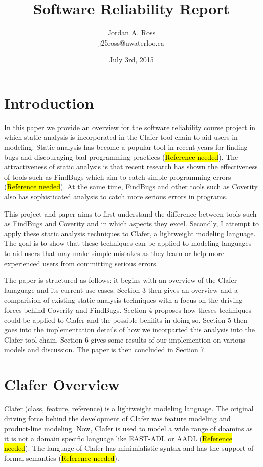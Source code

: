\documentclass[10pt,oneside]{IEEEtran}
\title{Software Reliability Report}
\author{Jordan A. Ross \\j25ross@uwaterloo.ca}
\date{July 3rd, 2015}
\begin{document}
\maketitle
\newpage

\section{Introduction}
In this paper we provide an overview for the software reliability course project in which static analysis
is incorporated in the Clafer tool chain to aid users in modeling. Static analysis has become a popular
tool in recent years for finding bugs and discouraging bad programming practices (\hl{Reference needed}).
The attractiveness of static analysis is that recent research has shown the effectiveness of tools
such as FindBugs which aim to catch simple programming errors (\hl{Reference needed}). At the same time, FindBugs
and other tools such as Coverity also has sophisticated analysis to catch more serious errors in programs.

This project and paper aims to first understand the difference between tools such as FindBugs and Coverity
and in which aspects they excel. Secondly, I attempt to apply these static analysis techniques to Clafer, a
lightweight modeling language. The goal is to show that these techniques can be applied to modeling languages
to aid users that may make simple mistakes as they learn or help more experienced users from committing serious
errors.

The paper is structured as follows: it begins with an overview of the Clafer lanaguage and its current use
cases. Section 3 then gives an overview and a comparision of existing static analysis techniques with a focus
on the driving forces behind Coverity and FindBugs. Section 4 proposes how theses techniques could be applied
to Clafer and the possible benifits in doing so. Section 5 then goes into the implementation details of how
we incorparted this analysis into the Clafer tool chain. Section 6 gives some results of our implemention on
various models and discussion. The paper is then concluded in Section 7.

\section{Clafer Overview}
Clafer (\underline{cla}ss, \underline{fe}ature, \underline{r}eference) is a lightweight modeling language.
The original driving force behind the development of Clafer was feature modeling and product-line modeling.
Now, Clafer is used to model a wide range of doamins as it is not a domain specific language like EAST-ADL
or AADL (\hl{Reference needed}). The language of Clafer has minimialistic syntax and has the support of
formal semantics (\hl{Reference needed}).
\end{document}
